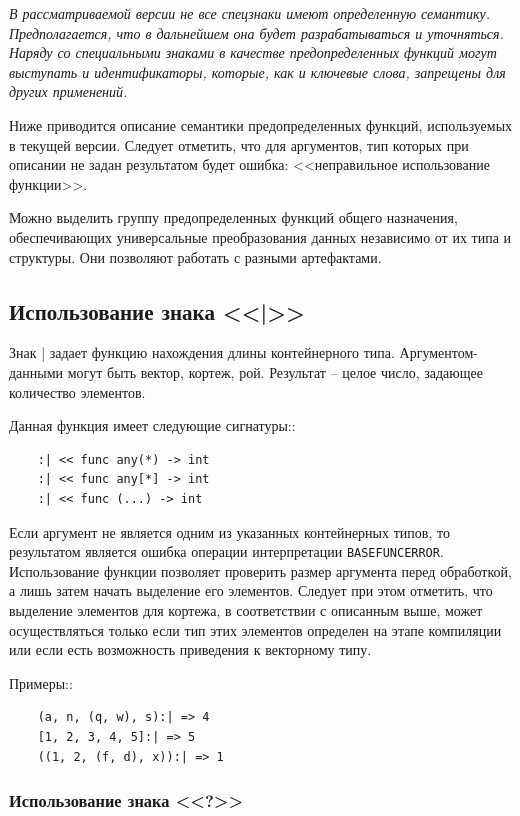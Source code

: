 \textit{В рассматриваемой версии не все спецзнаки имеют определенную семантику. Предполагается, что в дальнейшем она будет разрабатываться и уточняться. Наряду со специальными знаками в качестве предопределенных функций могут выступать и идентификаторы, которые, как и ключевые слова, запрещены для других применений.}

Ниже приводится описание семантики предопределенных функций, используемых в текущей версии. Следует отметить, что для аргументов, тип которых при описании не задан результатом будет ошибка: <<неправильное использование функции>>.

Можно выделить группу предопределенных функций общего назначения, обеспечивающих универсальные преобразования данных независимо от их типа и структуры. Они позволяют работать с разными артефактами.

\subsection{Использование знака <<|>>}

Знак \verb||| задает функцию нахождения длины контейнерного типа. Аргументом-данными могут быть вектор, кортеж, рой. Результат – целое число, задающее количество элементов.

Данная функция имеет следующие сигнатуры::

\begin{verbatim}
    :| << func any(*) -> int
    :| << func any[*] -> int
    :| << func (...) -> int
\end{verbatim}

Если аргумент не является одним из указанных контейнерных типов, то результатом является ошибка операции интерпретации \verb|BASEFUNCERROR|. Использование функции позволяет проверить размер аргумента перед обработкой, а лишь затем начать выделение его элементов. Следует при этом отметить, что выделение элементов для кортежа, в соответствии с описанным выше, может осуществляться только если тип этих элементов определен на этапе компиляции или если есть возможность приведения к векторному типу.

Примеры::

\begin{verbatim}
    (a, n, (q, w), s):| => 4
    [1, 2, 3, 4, 5]:| => 5
    ((1, 2, (f, d), x)):| => 1
\end{verbatim}

\subsubsection{Использование знака <<?>>}

